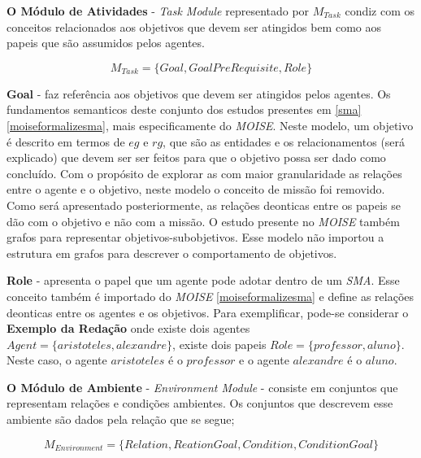 \textbf{O Módulo de Atividades} - \textit{Task Module} representado por $M_{Task}$ condiz com os conceitos relacionados aos objetivos que devem ser 
atingidos bem como aos papeis que são assumidos pelos agentes. 

\begin{equation}
    M_{Task} = \{ Goal, GoalPreRequisite, Role \}
\end{equation}

\textbf{Goal} - faz referência aos objetivos que devem ser atingidos pelos agentes. Os fundamentos semanticos deste conjunto dos estudos presentes em 
\ref{sma} \ref{moiseformalizesma}, mais especificamente do \textit{MOISE}. Neste modelo, um objetivo é descrito em termos de $eg$ e $rg$, que são as entidades e os relacionamentos 
(será explicado) que devem ser ser feitos para que o objetivo possa ser dado como concluído. Com o propósito de explorar as com maior granularidade 
as relações entre o agente e o objetivo, neste modelo o conceito de missão foi removido. Como será apresentado posteriormente, as relações deonticas 
entre os papeis se dão com o objetivo e não com a missão. O estudo presente no \textit{MOISE} também grafos para representar objetivos-subobjetivos. Esse 
modelo não importou a estrutura em grafos para descrever o comportamento de objetivos. 

\textbf{Role} - apresenta o papel que um agente pode adotar dentro de um \textit{SMA}. Esse conceito também é importado do \textit{MOISE} 
\ref{moiseformalizesma} e define as relações deonticas entre os agentes e os objetivos. Para exemplificar, pode-se considerar o \textbf{Exemplo da Redação} onde existe dois agentes $Agent = \{ aristoteles, alexandre \}$, existe dois papeis $Role = \{ professor, aluno\}$. Neste caso, o agente $aristoteles$ é  
o $professor$ e o agente $alexandre$ é o $aluno$.

\textbf{O Módulo de Ambiente} - \textit{Environment Module} - consiste em conjuntos que representam relações e condições ambientes.
Os conjuntos que descrevem esse ambiente são dados pela relação que se segue;

\begin{equation}
    M_{Environment} = \{ Relation, ReationGoal, Condition, ConditionGoal \}
\end{equation}

